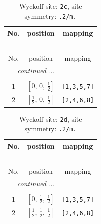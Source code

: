 \documentclass[fleqn,8pt]{jsarticle}
\begin{document}
\renewcommand{\arraystretch}{1.2}
\begin{longtable}{ccc}
\caption{Wyckoff site: {\tt 2c}, site symmetry: {\tt .2/m.}}
 \\
 \hline \hline
No. & position & mapping \\ \hline \endfirsthead

\multicolumn{2}{l}{\tablename\ \thetable{}} \\
 \hline \hline
No. & position & mapping \\ \hline \endhead

 \hline \hline
\multicolumn{2}{r}{\footnotesize\it continued ...} \\ \endfoot

 \hline \hline
\multicolumn{2}{r}{} \\ \endlastfoot

1 & $\left[ 0,\, 0,\, \frac{1}{2} \right]$ & {\tt [1,3,5,7]} \\ \hline
2 & $\left[ \frac{1}{2},\, 0,\, \frac{1}{2} \right]$ & {\tt [2,4,6,8]} \\
\end{longtable}
\renewcommand{\arraystretch}{1.2}
\begin{longtable}{ccc}
\caption{Wyckoff site: {\tt 2d}, site symmetry: {\tt .2/m.}}
 \\
 \hline \hline
No. & position & mapping \\ \hline \endfirsthead

\multicolumn{2}{l}{\tablename\ \thetable{}} \\
 \hline \hline
No. & position & mapping \\ \hline \endhead

 \hline \hline
\multicolumn{2}{r}{\footnotesize\it continued ...} \\ \endfoot

 \hline \hline
\multicolumn{2}{r}{} \\ \endlastfoot

1 & $\left[ 0,\, \frac{1}{2},\, \frac{1}{2} \right]$ & {\tt [1,3,5,7]} \\ \hline
2 & $\left[ \frac{1}{2},\, \frac{1}{2},\, \frac{1}{2} \right]$ & {\tt [2,4,6,8]} \\
\end{longtable}
\renewcommand{\arraystretch}{1.2}
\end{document}
